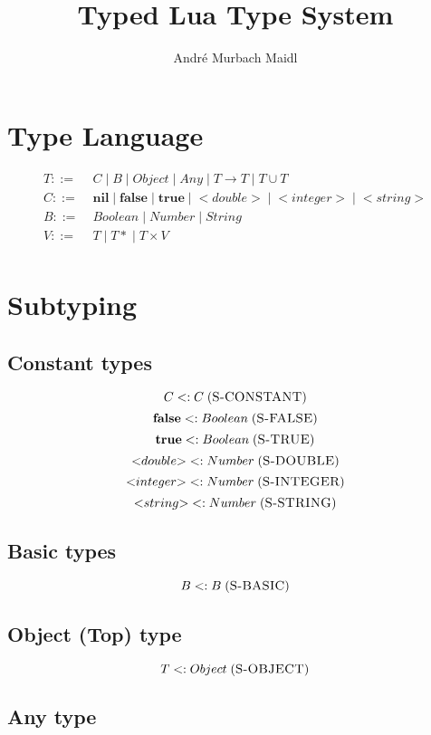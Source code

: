 \documentclass[12pt]{article}
\title{Typed Lua Type System}
\author{André Murbach Maidl}
\newcommand{\mylabel}[1]{\; (\textsc{#1})}
\newcommand{\subtype}{<:}
\newcommand{\pipe}{\;|\;}
\begin{document}
\maketitle

\section{Type Language}

\begin{align*}
T ::= \; & C \pipe B \pipe Object \pipe Any \pipe
T \rightarrow T \pipe T \cup T\\
C ::= \; & \mathbf{nil} \pipe \mathbf{false} \pipe \mathbf{true}
\pipe {<}double{>} \pipe {<}integer{>} \pipe {<}string{>}\\
B ::= \; & Boolean \pipe Number \pipe String\\
V ::= \; & T \pipe {T*} \pipe T \times V\\ 
\end{align*}

\section{Subtyping}

\subsection{Constant types}

\[
C \subtype C
\mylabel{S-CONSTANT}
\]
\[
\mathbf{false} \subtype Boolean
\mylabel{S-FALSE}
\]
\[
\mathbf{true} \subtype Boolean
\mylabel{S-TRUE}
\]
\[
{<}double{>} \subtype Number
\mylabel{S-DOUBLE}
\]
\[
{<}integer{>} \subtype Number
\mylabel{S-INTEGER}
\]
\[
{<}string{>} \subtype Number
\mylabel{S-STRING}
\]

\subsection{Basic types}

\[
B \subtype B
\mylabel{S-BASIC}
\]

\subsection{Object (Top) type}

\[
T \subtype Object
\mylabel{S-OBJECT}
\]

\subsection{Any type}
\end{document}

